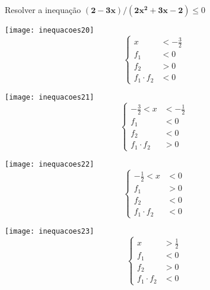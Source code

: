 \begin{example}{Resolver a inequação $\bm{(2-3x)/(2x^2+3x-2)}\leq0$}
\begin{minipage}{.195\linewidth}
\centering

\texttt{[image: inequacoes20]}
\begin{equation*}
\left \{
\begin{aligned}
x&<-\frac{3}{2}\\
f_1&<0\\
f_2&>0\\
f_1\cdot f_2&<0
\end{aligned}
\right.
\end{equation*}
\end{minipage}
\begin{minipage}{.395\linewidth}
\centering


\texttt{[image: inequacoes21]}
\begin{equation*}
\left \{
\begin{aligned}
-\frac{3}{2}<x&<-\frac{1}{2}\\
f_1&<0\\
f_2&<0\\
f_1\cdot f_2&>0
\end{aligned}
\right.
\end{equation*}
\end{minipage}
\begin{minipage}{.195\linewidth}
\centering


\texttt{[image: inequacoes22]}
\begin{equation*}
\left \{
\begin{aligned}
-\frac{1}{2}<x&<0\\
f_1&>0\\
f_2&<0\\
f_1\cdot f_2&<0
\end{aligned}
\right.
\end{equation*}
\end{minipage}
\begin{minipage}{.195\linewidth}
\centering

\texttt{[image: inequacoes23]}
\begin{equation*}
\left \{
\begin{aligned}
x&>\frac{1}{2}\\
f_1&<0\\
f_2&>0\\
f_1\cdot f_2&<0
\end{aligned}
\right.
\end{equation*}
\end{minipage}


\end{example}
